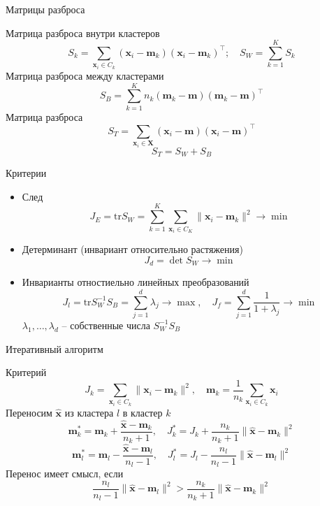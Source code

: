 \documentclass[10pt,a4paper]{beamer}
\begin{document}

\begin{frame}{Матрицы разброса}

Матрица разброса внутри кластеров
\[
S_k = \sum_{\mathbf{x}_i \in C_k} (\mathbf{x}_i - \mathbf{m}_k)(\mathbf{x}_i - \mathbf{m}_k)^\top; \quad S_W = \sum_{k=1}^K S_k
\]
Матрица разброса между кластерами
\[
S_B = \sum_{k=1}^K n_k (\mathbf{m}_k - \mathbf{m})(\mathbf{m}_k - \mathbf{m})^\top
\]
Матрица разброса
\[
S_T = \sum_{\mathbf{x}_i \in \mathbf{X}} (\mathbf{x}_i - \mathbf{m})(\mathbf{x}_i - \mathbf{m})^\top
\]
\[
\boxed{S_T = S_W + S_B}
\]

\end{frame}


\begin{frame}{Критерии}

\begin{itemize}
\item След
\[
J_E = \text{tr} S_W = \sum_{k=1}^K \sum_{\mathbf{x}_i \in C_K} \| \mathbf{x}_i - \mathbf{m}_k \|^2 \rightarrow \min
\]
\item Детерминант (инвариант относительно растяжения)
\[
J_d = \det S_W \rightarrow \min
\]
\item Инварианты отностиельно линейных преобразований \\ 
\[
J_l = \text{tr} S_W^{-1} S_B = \sum_{j=1}^d \lambda_j \rightarrow \max, \quad J_f = \sum_{j=1}^d \frac{1}{1 + \lambda_j} \rightarrow \min
\]
$\lambda_1, \ldots, \lambda_d$ -- собственные числа $S_W^{-1} S_B$
\end{itemize}

\end{frame}


\begin{frame}{Итеративный алгоритм}

Критерий
\[
J_k = \sum_{\mathbf{x}_i \in C_k} \| \mathbf{x}_i - \mathbf{m}_k \|^2, \quad
		\mathbf{m}_k = \frac{1}{n_k} \sum_{\mathbf{x}_i \in C_k} \mathbf{x}_i
\]
Переносим $\hat{\mathbf{x}}$ из кластера $l$ в кластер $k$ 
\[
\mathbf{m}_k^* = \mathbf{m}_k + \frac{\hat{\mathbf{x}} - \mathbf{m}_k}{n_k + 1}, \quad
J_k^* = J_k + \frac{n_k}{n_k+1} \|\hat{\mathbf{x}} - \mathbf{m}_k \|^2
\]
\[
\mathbf{m}_l^* = \mathbf{m}_l - \frac{\hat{\mathbf{x}} - \mathbf{m}_l}{n_l - 1}, \quad
J_l^* = J_l - \frac{n_l}{n_l - 1} \|\hat{\mathbf{x}} - \mathbf{m}_l \|^2
\]
Перенос имеет смысл, если
\[
\frac{n_l}{n_l - 1} \|\hat{\mathbf{x}} - \mathbf{m}_l \|^2 > \frac{n_k}{n_k+1} \|\hat{\mathbf{x}} - \mathbf{m}_k \|^2
\]

\end{frame}
\end{document}
